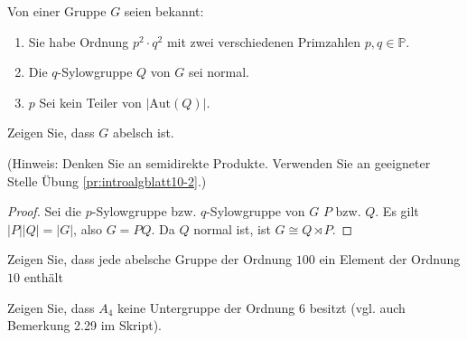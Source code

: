 \begin{Problem}
	Von einer Gruppe $G$ seien bekannt:
	\begin{enumerate}[label=(\arabic*)]
		\item Sie habe Ordnung $p^2\cdot q^2$ mit zwei verschiedenen Primzahlen $p,q\in \mathbb{P}$.
		\item Die $q$-Sylowgruppe $Q$ von $G$ sei normal.
		\item $p$ Sei kein Teiler von $|\text{Aut}(Q)|$.
	\end{enumerate}
	Zeigen Sie, dass $G$ abelsch ist.

	(Hinweis: Denken Sie an semidirekte Produkte. Verwenden Sie an geeigneter Stelle Übung \ref{pr:introalgblatt10-2}.)  
\end{Problem}
\begin{proof}
	Sei die $p$-Sylowgruppe bzw. $q$-Sylowgruppe von $G$ $P$ bzw. $Q$. Es gilt $|P| |Q|=|G|$, also $G=PQ$. Da $Q$ normal ist, ist $G\cong Q\rtimes P$.  
\end{proof}
\begin{Problem}
	\begin{parts}
	\item Zeigen Sie, dass jede abelsche Gruppe der Ordnung $100$ ein Element der Ordnung $10$ enthält
	\item Zeigen Sie, dass $A_4$ keine Untergruppe der Ordnung $6$ besitzt (vgl. auch Bemerkung 2.29 im Skript).
	\end{parts}
\end{Problem}
